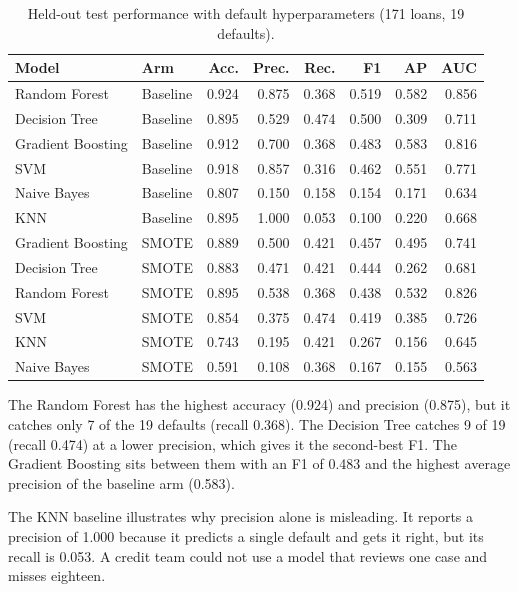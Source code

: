 \begin{table}[H]
    \centering
    \caption{Held-out test performance with default hyperparameters (171 loans, 19 defaults).}
    \label{tab:test-results}
    \small
    \begin{tabular}{@{}l l r r r r r r@{}}
        \toprule
        \textbf{Model} & \textbf{Arm} & \textbf{Acc.} & \textbf{Prec.} & \textbf{Rec.} & \textbf{F1} & \textbf{AP} & \textbf{AUC} \\
        \midrule
        Random Forest & Baseline & 0.924 & 0.875 & 0.368 & 0.519 & 0.582 & 0.856 \\
        Decision Tree & Baseline & 0.895 & 0.529 & 0.474 & 0.500 & 0.309 & 0.711 \\
        Gradient Boosting & Baseline & 0.912 & 0.700 & 0.368 & 0.483 & 0.583 & 0.816 \\
        SVM & Baseline & 0.918 & 0.857 & 0.316 & 0.462 & 0.551 & 0.771 \\
        Naive Bayes & Baseline & 0.807 & 0.150 & 0.158 & 0.154 & 0.171 & 0.634 \\
        KNN & Baseline & 0.895 & 1.000 & 0.053 & 0.100 & 0.220 & 0.668 \\
        Gradient Boosting & SMOTE & 0.889 & 0.500 & 0.421 & 0.457 & 0.495 & 0.741 \\
        Decision Tree & SMOTE & 0.883 & 0.471 & 0.421 & 0.444 & 0.262 & 0.681 \\
        Random Forest & SMOTE & 0.895 & 0.538 & 0.368 & 0.438 & 0.532 & 0.826 \\
        SVM & SMOTE & 0.854 & 0.375 & 0.474 & 0.419 & 0.385 & 0.726 \\
        KNN & SMOTE & 0.743 & 0.195 & 0.421 & 0.267 & 0.156 & 0.645 \\
        Naive Bayes & SMOTE & 0.591 & 0.108 & 0.368 & 0.167 & 0.155 & 0.563 \\
        \bottomrule
    \end{tabular}
\end{table}

The Random Forest has the highest accuracy (0.924) and precision (0.875), but it catches only 7 of the 19 defaults (recall 0.368). The Decision Tree catches 9 of 19 (recall 0.474) at a lower precision, which gives it the second-best F1. The Gradient Boosting sits between them with an F1 of 0.483 and the highest average precision of the baseline arm (0.583).

The KNN baseline illustrates why precision alone is misleading. It reports a precision of 1.000 because it predicts a single default and gets it right, but its recall is 0.053. A credit team could not use a model that reviews one case and misses eighteen.

